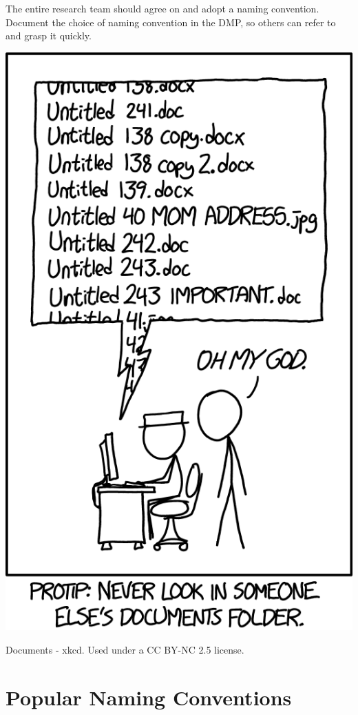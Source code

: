 \documentclass[
  letterpaper,
  DIV=11,
  numbers=noendperiod]{scrreprt}
\begin{document}
The entire research team should agree on and adopt a naming convention.
Document the choice of naming convention in the DMP, so others can refer
to and grasp it quickly.

\includegraphics{images/xkcd-file-naming.png}

Documents - xkcd. Used under a CC BY-NC 2.5 license.

\hypertarget{popular-naming-conventions}{%
\section*{Popular Naming Conventions}\label{popular-naming-conventions}}
\end{document}
